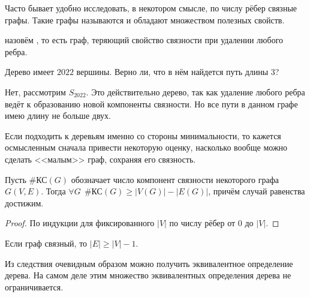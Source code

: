 Часто бывает удобно исследовать, в некотором смысле,  по числу рёбер связные графы.
Такие графы называются  и обладают множеством полезных свойств.

\begin{definition}
     назовём , то есть граф, теряющий свойство связности при удалении любого ребра.
\end{definition}

\begin{Exercise}[counter=SecExercise, label={exercise:graphs:star_tree}]
    \noindent
    Дерево имеет $ 2022 $ вершины.
    Верно ли, что в нём найдется путь длины $ 3 $?
\end{Exercise}

\begin{Answer}
    \noindent
    Нет, рассмотрим $ S_{2022} $.
    Это действительно дерево, так как удаление любого ребра ведёт к образованию новой компоненты связности.
    Но все пути в данном графе имею длину не больше двух.
\end{Answer}

Если подходить к деревьям именно со стороны минимальности, то кажется осмысленным сначала привести некоторую оценку,
насколько вообще можно сделать <<малым>> граф, сохраняя его связность.

\begin{theorem}
    Пусть $ \text{\#КС}(G) $ обозначает число компонент связности некоторого графа $ G(V, E) $.
    Тогда $ \forall G \;\, \text{\#КС}(G) \geqslant |V(G)| - |E(G)| $,
    причём случай равенства достижим.
\end{theorem}

\begin{proof}
    По индукции для фиксированного $ |V| $ по числу рёбер от $ 0 $ до $ |V| $.
\end{proof}

\begin{corollary}
    Если граф связный, то $ |E| \geqslant |V| - 1 $.
\end{corollary}

Из следствия очевидным образом можно получить эквивалентное определение дерева.
На самом деле этим множество эквивалентных определения дерева не ограничивается.

